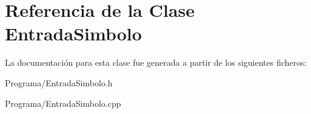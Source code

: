 \hypertarget{class_entrada_simbolo}{\section{Referencia de la Clase Entrada\-Simbolo}
\label{class_entrada_simbolo}
}


La documentación para esta clase fue generada a partir de los siguientes ficheros\-:\begin{DoxyCompactItemize}
\item 
Programa/Entrada\-Simbolo.\-h\item 
Programa/Entrada\-Simbolo.\-cpp\end{DoxyCompactItemize}
